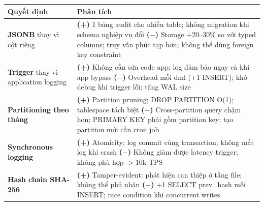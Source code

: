 \begin{center}
\centering
{}
\label{tab:tradeoffs}
\renewcommand{\arraystretch}{1.4}
\begin{tabularx}{\textwidth}{>{\raggedright\arraybackslash}p{3.8cm}>{\raggedright\arraybackslash}X}
\toprule
\textbf{Quyết định} & \textbf{Phân tích} \\
\midrule
\textbf{JSONB} thay vì cột riêng &
  \textbf{(+)} 1 bảng audit cho nhiều table; không migration khi schema nghiệp vụ đổi \newline
  \textbf{($-$)} Storage +20--30\% so với typed columns; truy vấn phức tạp hơn; không thể dùng foreign key constraint \\
\textbf{Trigger} thay vì application logging &
  \textbf{(+)} Không cần sửa code app; log đảm bảo ngay cả khi app bypass \newline
  \textbf{($-$)} Overhead mỗi \ac{dml} (+1 INSERT); khó debug khi trigger lỗi; tăng WAL size \\
\textbf{Partitioning theo tháng} &
  \textbf{(+)} Partition pruning; DROP PARTITION O(1); tablespace tách biệt \newline
  \textbf{($-$)} Cross-partition query chậm hơn; PRIMARY KEY phải gồm partition key; tạo partition mới cần cron job \\
\textbf{Synchronous logging} &
  \textbf{(+)} Atomicity: log commit cùng transaction; không mất log khi crash \newline
  \textbf{($-$)} Không giảm được latency trigger; không phù hợp $>$10k TPS \\
\textbf{Hash chain SHA-256} &
  \textbf{(+)} Tamper-evident: phát hiện can thiệp ở tầng file; không thể phủ nhận \newline
  \textbf{($-$)} +1 SELECT prev\_hash mỗi INSERT; race condition khi concurrent writes \\
\bottomrule
\end{tabularx}
\renewcommand{\arraystretch}{1}
\end{center}
